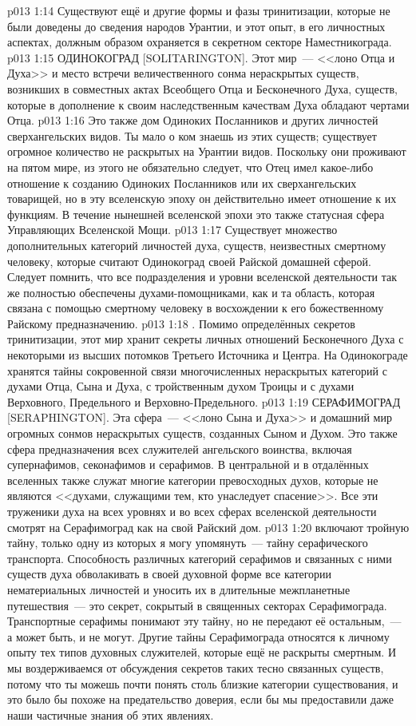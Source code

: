 \vs p013 1:14 Существуют ещё и другие формы и фазы тринитизации, которые не были доведены до сведения народов Урантии, и этот опыт, в его личностных аспектах, должным образом охраняется в секретном секторе Наместникограда.
\vs p013 1:15 ОДИНОКОГРАД [SOLITARINGTON]. Этот мир~--- <<лоно Отца и Духа>> и место встречи величественного сонма нераскрытых существ, возникших в совместных актах Всеобщего Отца и Бесконечного Духа, существ, которые в дополнение к своим наследственным качествам Духа обладают чертами Отца.
\vs p013 1:16 Это также дом Одиноких Посланников и других личностей сверхангельских видов. Ты мало о ком знаешь из этих существ; существует огромное количество не раскрытых на Урантии видов. Поскольку они проживают на пятом мире, из этого не обязательно следует, что Отец имел какое\hyp{}либо отношение к созданию Одиноких Посланников или их сверхангельских товарищей, но в эту вселенскую эпоху он действительно имеет отношение к их функциям. В течение нынешней вселенской эпохи это также статусная сфера Управляющих Вселенской Мощи.
\vs p013 1:17 Существует множество дополнительных категорий личностей духа, существ, неизвестных смертному человеку, которые считают Одинокоград своей Райской домашней сферой. Следует помнить, что все подразделения и уровни вселенской деятельности так же полностью обеспечены духами\hyp{}помощниками, как и та область, которая связана с помощью смертному человеку в восхождении к его божественному Райскому предназначению.
\vs p013 1:18 \pc {}. Помимо определённых секретов тринитизации, этот мир хранит секреты личных отношений Бесконечного Духа с некоторыми из высших потомков Третьего Источника и Центра. На Одинокограде хранятся тайны сокровенной связи многочисленных нераскрытых категорий с духами Отца, Сына и Духа, с тройственным духом Троицы и с духами Верховного, Предельного и Верховно\hyp{}Предельного.
\vs p013 1:19 СЕРАФИМОГРАД [SERAPHINGTON]. Эта сфера~--- <<лоно Сына и Духа>> и домашний мир огромных сонмов нераскрытых существ, созданных Сыном и Духом. Это также сфера предназначения всех служителей ангельского воинства, включая супернафимов, секонафимов и серафимов. В центральной и в отдалённых вселенных также служат многие категории превосходных духов, которые не являются <<духами, служащими тем, кто унаследует спасение>>. Все эти труженики духа на всех уровнях и во всех сферах вселенской деятельности смотрят на Серафимоград как на свой Райский дом.
\vs p013 1:20 \pc {} включают тройную тайну, только одну из которых я могу упомянуть~--- тайну серафического транспорта. Способность различных категорий серафимов и связанных с ними существ духа обволакивать в своей духовной форме все категории нематериальных личностей и уносить их в длительные межпланетные путешествия~--- это секрет, сокрытый в священных секторах Серафимограда. Транспортные серафимы понимают эту тайну, но не передают её остальным,~--- а может быть, и не могут. Другие тайны Серафимограда относятся к личному опыту тех типов духовных служителей, которые ещё не раскрыты смертным. И мы воздерживаемся от обсуждения секретов таких тесно связанных существ, потому что ты можешь почти понять столь близкие категории существования, и это было бы похоже на предательство доверия, если бы мы предоставили даже наши частичные знания об этих явлениях.
